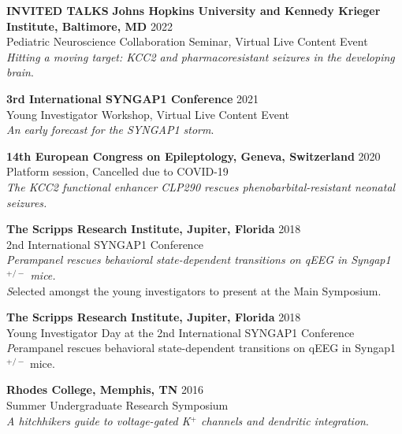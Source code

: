 \documentclass{resume} %
\begin{document}
\begin{rSection}{{\bfseries INVITED TALKS}}
    {\bfseries Johns Hopkins University and Kennedy Krieger Institute, Baltimore, MD} \hfill {2022} 
   \\ Pediatric Neuroscience Collaboration Seminar, Virtual Live Content Event
   \\ \emph{Hitting a moving target: KCC2 and pharmacoresistant seizures in the developing brain}.
   \item  {\bfseries 3rd International SYNGAP1 Conference} \hfill {2021}
   \\ Young Investigator Workshop, Virtual Live Content Event
   \\ \emph{An early forecast for the SYNGAP1 storm}.
   \item {\bfseries 14th European Congress on Epileptology, Geneva, Switzerland} \hfill{2020}
    \\  Platform session, Cancelled due to COVID-19
    \\ \emph{The KCC2 functional enhancer CLP290 rescues phenobarbital-resistant neonatal seizures.}
    \item {\bfseries The Scripps Research Institute, Jupiter, Florida} \hfill{2018}
    \\ 2nd International SYNGAP1 Conference
    \\ \emph{Perampanel rescues behavioral state-dependent transitions on qEEG in Syngap1$^{+/-}$ mice.} \vspace{0.3\baselineskip}
    \\ {\emph Selected amongst the young investigators to present at the Main Symposium}.
    \item {\bfseries The Scripps Research Institute, Jupiter, Florida} \hfill{2018} 
    \\ Young Investigator Day at the 2nd International SYNGAP1 Conference 
    \\ {\emph Perampanel rescues behavioral state-dependent transitions on qEEG in Syngap1$^{+/-}$ mice.} 
    \item {\bfseries Rhodes College, Memphis, TN} \hfill{2016}
    \\ Summer Undergraduate Research Symposium
    \\ \emph{A hitchhikers guide to voltage-gated K$^+$  channels and dendritic integration}.
\end{rSection}
\end{document}
